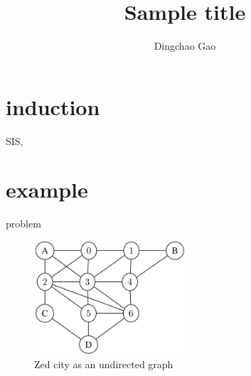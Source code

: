 \documentclass[aspectratio=1610]{beamer}
\title{Sample title}
\author[Gcc]{Dingchao Gao}
\institute[ISCAS]{Institute of Software Chinese Academy of Sciences}
\begin{document}
\begin{frame}[plain]
  \titlepage
\end{frame}
\section{induction}
\begin{frame}
  SIS, 
\end{frame}

\section{example}
\begin{frame}{problem \cite{example}}
  \begin{figure}[htbq]
    \centering
    \includegraphics[width=0.5\textwidth]{figure/problem.png}
    \caption{Zed city as an undirected graph} 
    \label{fig-zed}
  \end{figure}
\end{frame}
\end{document}
